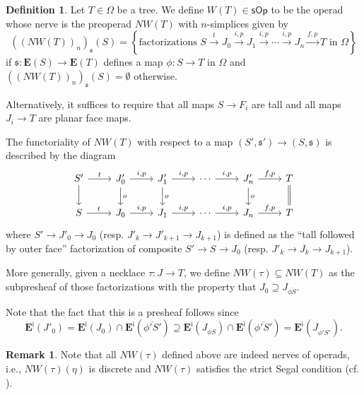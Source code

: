 \documentclass[a4paper,10pt
,draft
]{article}%
\numberwithin{equation}{section}
\numberwithin{figure}{section}
\theoremstyle{definition} %
\newtheorem{definition}[equation]{Definition}%
\newtheorem{remark}[equation]{Remark}%
\newcommand{\1}{\ensuremath{\mathbbm 1}}%
\begin{document}
\begin{definition}\label{NWTNS DEF}
	Let $T \in \Omega$ be a tree.
	We define 
	$W(T) \in \mathsf{sOp}$
	to be the operad whose nerve is the preoperad
	$NW(T)$ with $n$-simplices given by
	\[
	\left(\left(NW(T)\right)_n\right)_{\mathfrak{s}}(S)
	=
	\left\{
	\text{factorizations }
	S \xrightarrow{t} 
	J_0 \xrightarrow{i,p} 
	J_1 \xrightarrow{i,p} 
	\cdots \xrightarrow{i,p}
	J_n \xrightarrow{f,p}
	T
	\text{ in $\Omega$}
	\right\}
	\]
	if $\mathfrak{s} \colon \boldsymbol{E}(S) \to \boldsymbol{E}(T)$
	defines a map $\phi \colon S \to T$ in $\Omega$
	and
	$\left(\left(NW(T)\right)_n\right)_{\mathfrak{s}}(S) = \emptyset$
	otherwise.
	
	Alternatively, it suffices to require that all maps
	$S \to F_i$ are tall
	and all maps $J_i \to T$ are planar face maps.

	
	The functoriality of 
	$NW(T)$
	with respect to a map $(S', \mathfrak s') \to ({S},\mathfrak{s})$
	is described by the diagram
\[
\begin{tikzcd}
	S' \ar{r}{t} \ar{d}
&
	J'_0 \ar{r}{i,p} \ar{d}{o}
&
	J'_1 \ar{r}{i,p} \ar{d}{o}
&
	\cdots \ar{r}{i,p}
&
	J'_n \ar{r}{f,p} \ar{d}{o}
&
	T \ar[equal]{d}
\\
	S \ar{r}{t} 
&
	J_0 \ar{r}{i,p}
&
	J_1 \ar{r}{i,p}
&
	\cdots \ar{r}{i,p}
&
	J_n \ar{r}{f,p}
&
	T	
\end{tikzcd}
\]
	where 
	$S' \to J'_0 \to J_0$
	(resp. $J'_k \to J'_{k+1} \to J_{k+1}$)
	is defined as the ``tall followed by outer face''
	factorization of composite
	$S' \to S \to J_0$
	(resp. $J'_k \to J_{k} \to J_{k+1}$).

	More generally, 
	given a necklace $\tau\colon J \to T$,
	we define
	$NW(\tau) \subseteq NW(T)$
	as the subpresheaf
	of those factorizations with the property that
	$J_0 \supseteq J_{\overline{\phi S}}$.

	Note that the fact that this is a presheaf follows 
	since
\[
	\boldsymbol{E}^{\mathsf{i}}(J'_0)
=
	\boldsymbol{E}^{\mathsf{i}}(J_0)
	\cap
	\boldsymbol{E}^{\mathsf{i}}(\overline{\phi' S'})
\supseteq
	\boldsymbol{E}^{\mathsf{i}}(J_{\overline{\phi S}})
	\cap
	\boldsymbol{E}^{\mathsf{i}}(\overline{\phi' S'})
=
	\boldsymbol{E}^{\mathsf{i}}(J_{\overline{\phi' S'}}).
\]
\end{definition}



\begin{remark}
	Note that all
	$NW(\tau)$ defined above are indeed nerves of operads,
	i.e., 
	$NW(\tau)(\eta)$ is discrete
	and
	$NW(\tau)$ satisfies the strict Segal condition
	(cf. \cite[Cor 3.69]{BP_geo}).
\end{remark}
\end{document}
